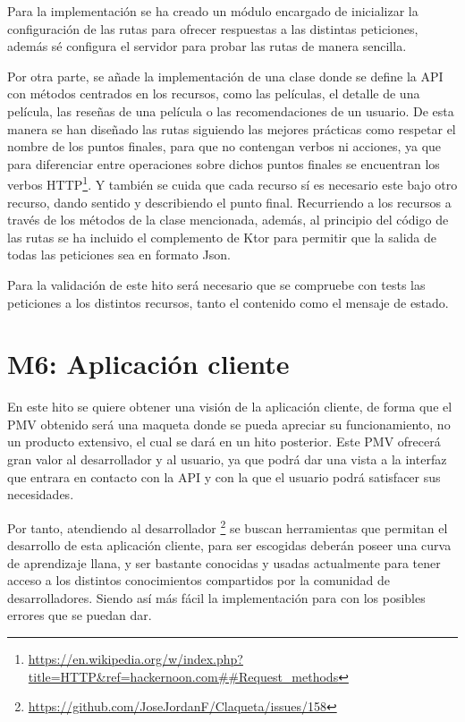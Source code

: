 Para la implementación se ha creado un módulo encargado de inicializar la configuración de las rutas para 
ofrecer respuestas a las distintas peticiones, además sé configura el servidor para probar las rutas de 
manera sencilla. 

Por otra parte, se añade la implementación de una clase donde se define la API con métodos centrados en los recursos,
como las películas, el detalle de una película, las reseñas de una película o las recomendaciones de un usuario. De
esta manera se han diseñado las rutas siguiendo las mejores prácticas \cite{RestPract} como respetar el nombre de los 
puntos finales, para que no contengan verbos ni acciones, ya que para diferenciar entre operaciones sobre dichos 
puntos finales se encuentran los verbos HTTP\footnote{\url{https://en.wikipedia.org/w/index.php?title=HTTP&ref=hackernoon.com##Request_methods}}. 
Y también se cuida que cada recurso sí es necesario este bajo otro recurso, dando sentido y describiendo el punto 
final.  Recurriendo a los recursos a través de los métodos de la clase mencionada, además, al principio del 
código de las rutas se ha incluido el complemento de Ktor para permitir que la salida de todas las peticiones sea en 
formato Json.

Para la validación de este hito será necesario que se compruebe con tests las peticiones a los distintos recursos, 
tanto el contenido como el mensaje de estado.

\section{M6: Aplicación cliente}

En este hito se quiere obtener una visión de la aplicación cliente, de forma que el PMV obtenido será una maqueta 
donde se pueda apreciar su funcionamiento, no un producto extensivo, el cual se dará en un hito posterior. Este PMV 
ofrecerá gran valor al desarrollador y al usuario, ya que podrá dar una vista a la interfaz que entrara en contacto 
con la API y con la que el usuario podrá satisfacer sus necesidades.

Por tanto, atendiendo al desarrollador \footnote{\url{https://github.com/JoseJordanF/Claqueta/issues/158}} se buscan 
herramientas que permitan el desarrollo de esta aplicación cliente, para ser escogidas deberán poseer una curva de 
aprendizaje llana, y ser bastante conocidas y usadas actualmente para tener acceso a los distintos conocimientos 
compartidos por la comunidad de desarrolladores. Siendo así más fácil la implementación para con los posibles errores 
que se puedan dar.

